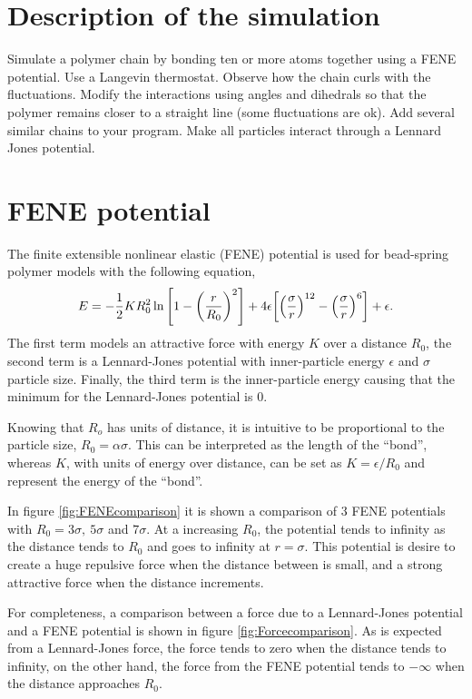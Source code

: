 \documentclass[main.tex]{subfiles}
\begin{document}
\section{Description of the simulation}

Simulate a polymer chain by bonding ten or more atoms together using a FENE potential. 
Use a Langevin thermostat. 
Observe how the chain curls with the fluctuations.
Modify the interactions using angles and dihedrals so that the polymer remains closer to a straight line (some fluctuations are ok). 
Add several similar chains to your program. 
Make all particles interact through a Lennard Jones potential. 

\section{FENE potential}

The finite extensible nonlinear elastic (FENE) potential \cite{bond_style_FENE_LAMMPSdoc} is used for bead-spring polymer models with the following equation,
\begin{gather}
    E = -\frac{1}{2}KR_{0}^{2}\ln\qty[1-\qty(\frac{r}{R_{0}})^{2}]+4\epsilon\qty[\qty(\frac{\sigma}{r})^{12}-\qty(\frac{\sigma}{r})^{6}]+\epsilon \label{eqn4:FENEpotential}.
\end{gather}
The first term models an attractive force with energy $K$ over a distance $R_{0}$, the second term is a Lennard-Jones potential with inner-particle energy $\epsilon$ and $\sigma$ particle size.
Finally, the third term is the inner-particle energy causing that the minimum for the Lennard-Jones potential is 0.

Knowing that $R_{o}$ has units of distance, it is intuitive to be proportional to the particle size, $R_{0} = \alpha\sigma$.
This can be interpreted as the length of the ``bond'', whereas $K$, with units of energy over distance, can be set as $K = \epsilon/R_{0}$ and represent the energy of the ``bond''.

In figure \ref{fig:FENEcomparison} it is shown a comparison of 3 FENE potentials with $R_{0} = 3\sigma,~5\sigma$ and $7\sigma$.
At a increasing $R_{0}$, the potential tends to infinity as the distance tends to $R_{0}$ and goes to infinity at $r=\sigma$.
This potential is desire to create a huge repulsive force when the distance between is small, and a strong attractive force when the distance increments.

For completeness, a comparison between a force due to a Lennard-Jones potential and a FENE potential is shown in figure \ref{fig:Forcecomparison}.
As is expected from a Lennard-Jones force, the force tends to zero when the distance tends to infinity, on the other hand, the force from the FENE potential tends to $-\infty$ when the distance approaches $R_{0}$.
\end{document}
